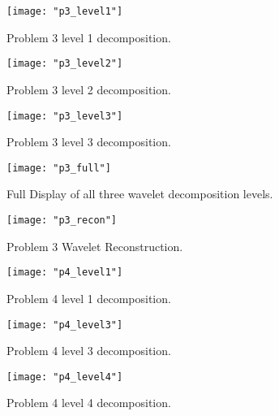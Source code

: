\documentclass[./rarnold_report5.tex]{subfiles}
\begin{document}
	\begin{figure}[!htbp]
	\centering
	\texttt{[image: "p3\_level1"]}
	\captionsetup{justification=centering}
	\caption{Problem 3 level 1 decomposition.} 
	\label{p3l1}
	\end{figure}
	
	\clearpage
	
	\begin{figure}[!htbp]
	\centering
	\texttt{[image: "p3\_level2"]}
	\captionsetup{justification=centering}
	\caption{Problem 3 level 2 decomposition.} 
	\label{p3l2}
	\end{figure}
	
	\clearpage 
	
	\begin{figure}[!htbp]
	\centering
	\texttt{[image: "p3\_level3"]}
	\captionsetup{justification=centering}
	\caption{Problem 3 level 3 decomposition.} 
	\label{p3l3}
	\end{figure}
	
	\clearpage
	
  	\begin{figure}[!htbp]
	\centering
	\texttt{[image: "p3\_full"]}
	\captionsetup{justification=centering}
	\caption{Full Display of all three wavelet decomposition levels.} 
	\label{full}
	\end{figure}
	
	\clearpage
	
	\begin{figure}[!htbp]
	\centering
	\texttt{[image: "p3\_recon"]}
	\captionsetup{justification=centering}
	\caption{Problem 3 Wavelet Reconstruction.} 
	\label{p3recon}
	\end{figure}
	
	\clearpage
	
	\begin{figure}[!htbp]
	\centering
	\texttt{[image: "p4\_level1"]}
	\captionsetup{justification=centering}
	\caption{Problem 4 level 1 decomposition.} 
	\label{p4l1}
	\end{figure}
	
	\clearpage
	
	\begin{figure}[!htbp]
	\centering
	\texttt{[image: "p4\_level3"]}
	\captionsetup{justification=centering}
	\caption{Problem 4 level 3 decomposition.} 
	\label{p4l3}
	\end{figure}
	
	\clearpage
	
	\begin{figure}[!htbp]
	\centering
	\texttt{[image: "p4\_level4"]}
	\captionsetup{justification=centering}
	\caption{Problem 4 level 4 decomposition.} 
	\label{p4l4}
	\end{figure}
	
\end{document}
